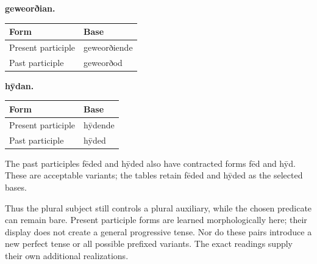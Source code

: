 \textbf{geweorðian.}

\par\begingroup
\fontsize{10.5}{13.2}\selectfont
\setlength{\LTleft}{0pt}\setlength{\LTright}{\fill}
\noindent
\begin{tabular}{@{}>{\raggedright\arraybackslash}p{64.38mm}>{\raggedright\arraybackslash}p{56.81mm}@{}}
\toprule
\textbf{Form} & \textbf{Base} \\
\midrule
Present participle & geweorðiende \\
Past participle & geweorðod \\
\bottomrule
\end{tabular}
\par\endgroup

\textbf{hȳdan.}

\par\begingroup
\fontsize{10.5}{13.2}\selectfont
\setlength{\LTleft}{0pt}\setlength{\LTright}{\fill}
\noindent
\begin{tabular}{@{}>{\raggedright\arraybackslash}p{69.84mm}>{\raggedright\arraybackslash}p{51.35mm}@{}}
\toprule
\textbf{Form} & \textbf{Base} \\
\midrule
Present participle & hȳdende \\
Past participle & hȳded \\
\bottomrule
\end{tabular}
\par\endgroup

The past participles fēded and hȳded also have contracted forms fēd and hȳd. These are acceptable variants; the tables retain fēded and hȳded as the selected bases.

Thus the plural subject still controls a plural auxiliary, while the chosen predicate can remain bare. Present participle forms are learned morphologically here; their display does not create a general progressive tense. Nor do these pairs introduce a new perfect tense or all possible prefixed variants. The exact readings supply their own additional realizations.

